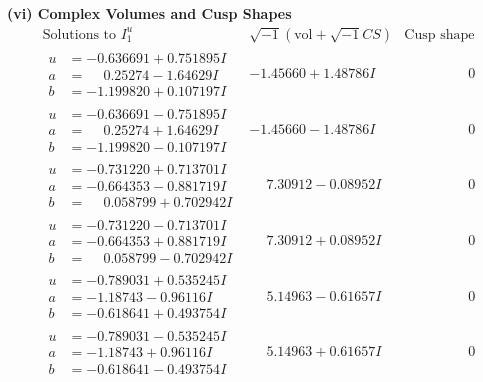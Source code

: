\documentclass[1p]{elsarticle_modified}
\theoremstyle{definition}
\newcommand{\I}{\sqrt{-1}}
\begin{document}
\newpage\flushleft \textbf{(vi) Complex Volumes and Cusp Shapes}
$$\begin{array}{c|c|c}  
\text{Solutions to }I^u_{1}& \I (\text{vol} + \sqrt{-1}CS) & \text{Cusp shape}\\
 \hline 
\begin{aligned}
u &= -0.636691 + 0.751895 I \\
a &= \phantom{-}0.25274 - 1.64629 I \\
b &= -1.199820 + 0.107197 I\end{aligned}
 & -1.45660 + 1.48786 I & \phantom{-0.000000 } 0 \\ \hline\begin{aligned}
u &= -0.636691 - 0.751895 I \\
a &= \phantom{-}0.25274 + 1.64629 I \\
b &= -1.199820 - 0.107197 I\end{aligned}
 & -1.45660 - 1.48786 I & \phantom{-0.000000 } 0 \\ \hline\begin{aligned}
u &= -0.731220 + 0.713701 I \\
a &= -0.664353 - 0.881719 I \\
b &= \phantom{-}0.058799 + 0.702942 I\end{aligned}
 & \phantom{-}7.30912 - 0.08952 I & \phantom{-0.000000 } 0 \\ \hline\begin{aligned}
u &= -0.731220 - 0.713701 I \\
a &= -0.664353 + 0.881719 I \\
b &= \phantom{-}0.058799 - 0.702942 I\end{aligned}
 & \phantom{-}7.30912 + 0.08952 I & \phantom{-0.000000 } 0 \\ \hline\begin{aligned}
u &= -0.789031 + 0.535245 I \\
a &= -1.18743 - 0.96116 I \\
b &= -0.618641 + 0.493754 I\end{aligned}
 & \phantom{-}5.14963 - 0.61657 I & \phantom{-0.000000 } 0 \\ \hline\begin{aligned}
u &= -0.789031 - 0.535245 I \\
a &= -1.18743 + 0.96116 I \\
b &= -0.618641 - 0.493754 I\end{aligned}
 & \phantom{-}5.14963 + 0.61657 I & \phantom{-0.000000 } 0 \\ \hline\begin{aligned}

\end{aligned}
\end{array}$$
\end{document}
